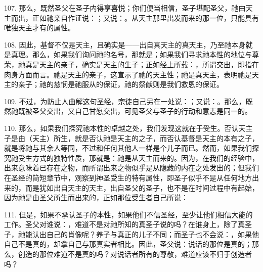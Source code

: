 107. 那么，既然圣父在圣子内得享喜悦；你们便当相信，圣子堪配圣父，祂由天主而出，正如祂亲自作证说：；又说：。从天主那里出发而来的那一位，只能具有唯独天主才有的属性。\par

\par

108. 因此，基督不仅是天主，且确实是——出自真天主的真天主，乃至祂本身就是真理。那么，如果我们询问祂的名号，那就是；如果我们寻求祂本性的地位与尊荣，祂真是天主的亲子，确实是天主的生子；正如经上所载：，所谓交出，即指在肉身方面而言。祂是天主的亲子，这宣示了祂的天主性；祂是真天主，表明祂是天主的亲子；祂的慈悯是祂服从的保证，祂的祭献则是我们救恩的保证。\par

109. 不过，为防止人曲解这句圣经，宗徒自己另在一处说：；又说：。那么，既然祂既被圣父交出，又自己甘愿交出，可见圣父与圣子的行动和意志是同一的。\par

110. 那么，如果我们探究祂本性的卓越之处，我们发现这就在于受生。否认天主子是由（天主）所生，就是否认祂是天主的之子，而否认基督是天主的本有之子，就是将祂与其余人等同，不过和任何其他人一样是个儿子而已。然而，如果我们探究祂受生方式的独特性质，那就是：祂是从天主而来的。因为，在我们的经验中，出来意味着已存在之物，而所谓出来之物似乎是从隐藏的内在之处发出的；但我们在圣经的简短章节中，观察到神圣受生的特有属性，即圣子似乎不是从任何地方出来的，而是犹如出自天主的天主，出自圣父的圣子，也不是在时间过程中有起始，因为祂是由圣父所生而出来的，正如那位受生者自己所说：\par

111. 但是，如果不承认圣子的本性，如果他们不信圣经，至少让他们相信大能的工作。圣父对谁说：，难道不是对祂所知的真圣子说的吗？在谁身上，除了真圣子，祂能认出自己的肖像呢？养子与真正的儿子不同；而圣子也不会说：，如果他自己不是真的，却拿自己与那真实者相比。因此，圣父说：说话的那位是真的；那么，创造的那位难道不是真的吗？对说话者所有的尊敬，难道应该不归于创造者吗？\par

